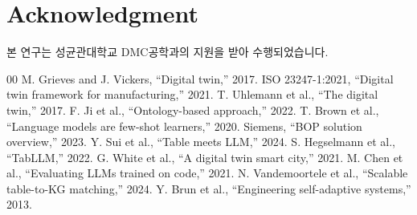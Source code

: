 \documentclass[conference]{IEEEtran}
\begin{document}
\section*{Acknowledgment}
본 연구는 성균관대학교 DMC공학과의 지원을 받아 수행되었습니다.

\begin{thebibliography}{00}
 M. Grieves and J. Vickers, ``Digital twin,'' 2017.
 ISO 23247-1:2021, ``Digital twin framework for manufacturing,'' 2021.
 T. Uhlemann et al., ``The digital twin,'' 2017.
 F. Ji et al., ``Ontology-based approach,'' 2022.
 T. Brown et al., ``Language models are few-shot learners,'' 2020.
 Siemens, ``BOP solution overview,'' 2023.
 Y. Sui et al., ``Table meets LLM,'' 2024.
 S. Hegselmann et al., ``TabLLM,'' 2022.
 G. White et al., ``A digital twin smart city,'' 2021.
 M. Chen et al., ``Evaluating LLMs trained on code,'' 2021.
 N. Vandemoortele et al., ``Scalable table-to-KG matching,'' 2024.
 Y. Brun et al., ``Engineering self-adaptive systems,'' 2013.
\end{thebibliography}
\end{document}
